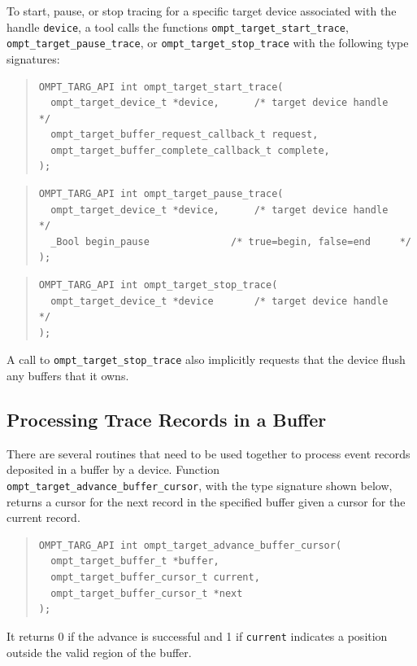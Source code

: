 \documentclass{article}
\begin{document}
To start, pause, or stop tracing for a specific target device associated with the handle \verb|device|, 
a tool calls the functions \verb|ompt_target_start_trace|, \verb|ompt_target_pause_trace|, or \verb|ompt_target_stop_trace| with the following type signatures:
\begin{quote}
\begin{verbatim}
OMPT_TARG_API int ompt_target_start_trace(
  ompt_target_device_t *device,      /* target device handle      */
  ompt_target_buffer_request_callback_t request,
  ompt_target_buffer_complete_callback_t complete,
);
\end{verbatim}
\end{quote}

\begin{quote}
\begin{verbatim}
OMPT_TARG_API int ompt_target_pause_trace(
  ompt_target_device_t *device,      /* target device handle      */
  _Bool begin_pause              /* true=begin, false=end     */
);
\end{verbatim}
\end{quote}

\begin{quote}
\begin{verbatim}
OMPT_TARG_API int ompt_target_stop_trace(
  ompt_target_device_t *device       /* target device handle      */
);
\end{verbatim}
\end{quote}
\noindent
A call to \verb|ompt_target_stop_trace| also implicitly requests that the device flush any buffers that it owns.

\subsection{Processing Trace Records in a Buffer}
\label{sec:record-data}

There are several routines that need to be used together to process %
event records deposited in a buffer by a device. Function \verb|ompt_target_advance_buffer_cursor|, with the type signature shown below, returns a cursor for the next record in the specified buffer given a cursor for the current record.

\begin{quote}
\begin{verbatim}
OMPT_TARG_API int ompt_target_advance_buffer_cursor(
  ompt_target_buffer_t *buffer, 
  ompt_target_buffer_cursor_t current, 
  ompt_target_buffer_cursor_t *next
); 
\end{verbatim}
\end{quote}
It returns 0 if the advance is successful and 1 if \verb|current| indicates a position outside the valid region of the buffer.
\end{document}
